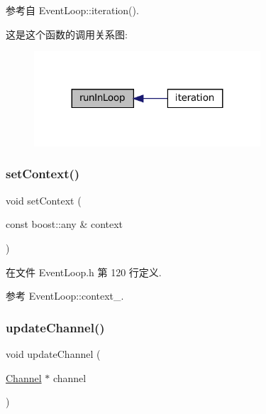 参考自 Event\+Loop\+::iteration().

这是这个函数的调用关系图\+:
\nopagebreak
\begin{figure}[H]
\begin{center}
\leavevmode
\includegraphics[width=239pt]{classmuduo_1_1net_1_1EventLoop_a85ed7594d67ceea00ae641d1dddb80d8_icgraph}
\end{center}
\end{figure}
\mbox{\label{classmuduo_1_1net_1_1EventLoop_a332ba7a521a446572051bc6939f4c4fa}} 
\subsubsection{\texorpdfstring{set\+Context()}{setContext()}}
{\footnotesize\ttfamily void set\+Context (\begin{DoxyParamCaption}\item[{const boost\+::any \&}]{context }\end{DoxyParamCaption})\hspace{0.3cm}{\ttfamily [inline]}}



在文件 Event\+Loop.\+h 第 120 行定义.



参考 Event\+Loop\+::context\+\_\+.

\mbox{\label{classmuduo_1_1net_1_1EventLoop_acaa4a191936aacf608d279a6f343d533}} 
\subsubsection{\texorpdfstring{update\+Channel()}{updateChannel()}}
{\footnotesize\ttfamily void update\+Channel (\begin{DoxyParamCaption}\item[{\hyperlink{classmuduo_1_1net_1_1Channel}{Channel} $\ast$}]{channel }\end{DoxyParamCaption})}



